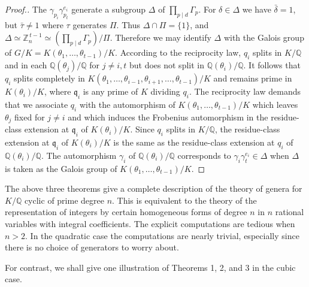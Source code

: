 \begin{proof}[Proof.]
The $\gamma_{p_{i}}\gamma_{p_{t}}^{e_{i}}$ generate a subgroup $\Delta$
of $\prod_{p\mid d}\Gamma_{p}$. For $\delta\in\Delta$ we have
$\bar{\delta}=1$, but $\bar{\tau}\neq 1$ where $\tau$ generates $\Pi$.
Thus $\Delta\cap\Pi=\{1\}$, and
$\Delta\simeq\mathbb{Z}_{n}^{\,t-1}\simeq
(\prod_{p\mid d}\Gamma_{p})/\Pi$. Therefore we may identify $\Delta$ with
the Galois group of $G/K=K(\theta_{1},\ldots,\theta_{t-1})/K$.
According to the reciprocity law, $q_{i}$ splits in $K/\mathbb{Q}$ and in
each $\mathbb{Q}(\theta_{j})/\mathbb{Q}$ for $j\neq i,t$ but does not
split in $\mathbb{Q}(\theta_{i})/\mathbb{Q}$. It follows that $q_{i}$
splits completely in
$K(\theta_{1},\ldots,\theta_{i-1},\theta_{i+1},\ldots,\theta_{t-1})/K$
and remains prime in $K(\theta_{i})/K$, where $\mathfrak{q}_{i}$ is any
prime of $K$ dividing $q_{i}$. The reciprocity law demands that we
associate $q_{i}$ with the automorphism of
$K(\theta_{1},\ldots,\theta_{t-1})/K$ which leaves $\theta_{j}$ fixed for
$j\neq i$ and which induces the Frobenius automorphism in the
residue-class extension at $\mathfrak{q}_{i}$ of $K(\theta_{i})/K$. Since
$q_{i}$ splits in $K/\mathbb{Q}$, the residue-class extension at
$\mathfrak{q}_{i}$ of $K(\theta_{i})/K$ is the same as the residue-class
extension at $q_{i}$ of $\mathbb{Q}(\theta_{i})/\mathbb{Q}$. The
automorphism $\gamma_{i}$ of $\mathbb{Q}(\theta_{i})/\mathbb{Q}$
corresponds to $\gamma_{i}\gamma_{t}^{e_{i}}\in\Delta$ when $\Delta$ is
taken as the Galois group of
$K(\theta_{1},\ldots,\theta_{t-1})/K$.
\end{proof}

The above three theorems give a complete description of the theory of
genera for $K/\mathbb{Q}$ cyclic of prime degree $n$. This is equivalent
to the theory of the representation of integers by certain homogeneous
forms of degree $n$ in $n$ rational variables with integral coefficients.
The explicit computations are tedious when $n>2$. In the quadratic case
the computations are nearly trivial, especially since there is no choice
of generators to worry about.

For contrast, we shall give one illustration of Theorems 1, 2, and 3 in
the cubic case.

